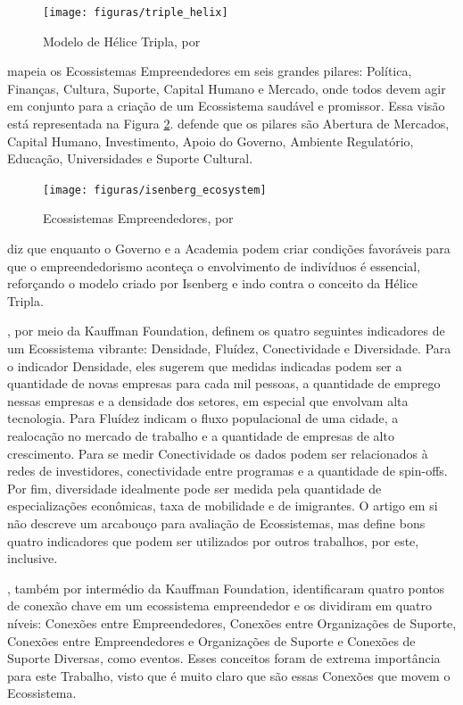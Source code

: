 \begin{figure}[!htb]
\centering
\texttt{[image: figuras/triple\_helix]}
\caption{Modelo de Hélice Tripla, por }
\label{figure:triple_helix}
\end{figure}

 mapeia os Ecossistemas Empreendedores em seis grandes pilares: Política, Finanças, Cultura, Suporte, Capital Humano e Mercado, onde todos devem agir em conjunto para a criação de um Ecossistema saudável e promissor. Essa visão está representada na Figura \ref{figure:isenberg_ecosystem}.  defende que os pilares são Abertura de Mercados, Capital Humano, Investimento, Apoio do Governo, Ambiente Regulatório, Educação, Universidades e Suporte Cultural.

\begin{figure}[!htb]
\centering
\texttt{[image: figuras/isenberg\_ecosystem]}
\caption{Ecossistemas Empreendedores, por }
\label{figure:isenberg_ecosystem}
\end{figure}

 diz que enquanto o Governo e a Academia podem criar condições favoráveis para que o empreendedorismo aconteça o envolvimento de indivíduos é essencial, reforçando o modelo criado por Isenberg e indo contra o conceito da Hélice Tripla.

, por meio da Kauffman Foundation, definem os quatro seguintes indicadores de um Ecossistema vibrante: Densidade, Fluídez, Conectividade e Diversidade. Para o indicador Densidade, eles sugerem que medidas indicadas podem ser a quantidade de novas empresas para cada mil pessoas, a quantidade de emprego nessas empresas e a densidade dos setores, em especial que envolvam alta tecnologia. Para Fluídez indicam o fluxo populacional de uma cidade, a realocação no mercado de trabalho e a quantidade de empresas de alto crescimento. Para se medir Conectividade os dados podem ser relacionados à redes de investidores, conectividade entre programas e a quantidade de spin-offs. Por fim, diversidade idealmente pode ser medida pela quantidade de especializações econômicas, taxa de mobilidade e de imigrantes. O artigo em si não descreve um arcabouço para avaliação de Ecossistemas, mas define bons quatro indicadores que podem ser utilizados por outros trabalhos, por este, inclusive. 

, também por intermédio da Kauffman Foundation, identificaram quatro pontos de conexão chave em um ecossistema empreendedor e os dividiram em quatro níveis: Conexões entre Empreendedores, Conexões entre Organizações de Suporte, Conexões entre Empreendedores e Organizações de Suporte e Conexões de Suporte Diversas, como eventos. Esses conceitos foram de extrema importância para este Trabalho, visto que é muito claro que são essas Conexões que movem o Ecossistema.

